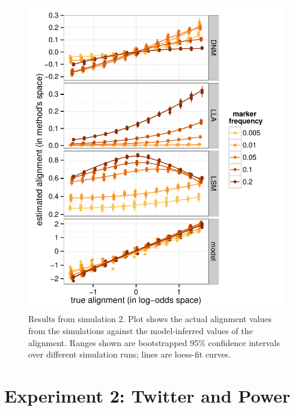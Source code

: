\documentclass{acm_proc_article-sp}
\begin{document}
\begin{figure}[t]
\centering
\includegraphics[width=\columnwidth]{graphics/www2016_simulation2b_crossiter.pdf}
\caption{Results from simulation 2. Plot shows the actual alignment values from the simulations against the model-inferred values of the alignment. Ranges shown are bootstrapped 95\% confidence intervals over different simulation runs; lines are loess-fit curves.}\label{fig:sim2}
\end{figure}




\section{Experiment 2: Twitter and Power}
\end{document}
